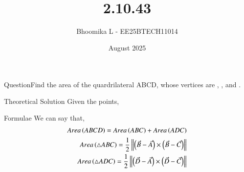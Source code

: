 \documentclass{beamer}
\title %
{2.10.43}
\date{August  2025}
\author %
{Bhoomika L - EE25BTECH11014}
\begin{document}
\frame{\titlepage}
\begin{frame}{Question}Find the area of the quardrilateral ABCD, whose vertices are
 ,   ,   and  .
\end{frame}


\begin{frame}{Theoretical Solution}
Given the points,
\begin{table}[H]    
  \centering
  
  \caption{Vectors of the vertices of quadrilateral}
  \label{tab:2.7.26}
\end{table}
\end{frame}

\begin{frame}{Formulae}
 We can say that,
\begin{align}
Area \left(ABCD\right) = Area \left(ABC\right) + Area \left(ADC\right) \\
Area\left(\triangle ABC\right)= {\frac{1}{2}} \left\| \left(\Vec{B}-\Vec{A}\right) \times \left(\Vec{B}-\Vec{C}\right) \right\|\\
Area\left(\triangle ADC\right)= {\frac{1}{2}} \left\| \left(\Vec{D}-\Vec{A}\right) \times \left(\Vec{D}-\Vec{C}\right) \right\|
\end{align}
\end{frame}
\end{document}
